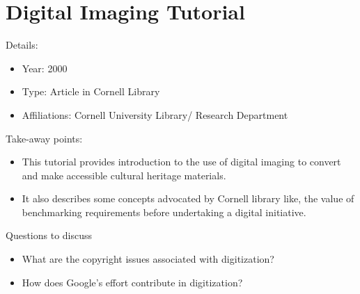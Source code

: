 \documentclass[12pt, onecolumn]{IEEEtran}
\begin{document}
\section{Digital Imaging Tutorial}
\noindent Details:
\begin{itemize}
  \item Year: 2000
  \item Type: Article in Cornell Library
  \item Affiliations: Cornell University Library/ Research Department
\end{itemize}
\medskip
Take-away points: 
\begin{itemize}
  \item This tutorial provides introduction to the use of digital
  imaging to convert and make accessible cultural heritage materials.
  \item It also describes some concepts advocated by Cornell library like, the
  value of benchmarking requirements before undertaking a digital initiative.
\end{itemize}
	
\noindent Questions to discuss
\begin{itemize}
  \item What are the copyright issues associated with digitization?
  \item How does Google's effort contribute in digitization?
\end{itemize}
\bigskip\bigskip





\end{document}
